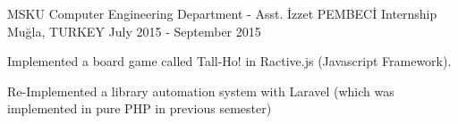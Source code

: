 \begin{cventries}
    \cventry
        {MSKU Computer Engineering Department - Asst. İzzet PEMBECİ}
        {Internship}
        {Muğla, TURKEY}
        {July 2015 - September 2015}
        {
          \begin{cvitems}
            \item {Implemented a board game called Tall-Ho! in Ractive.js (Javascript Framework).}
            \item {Re-Implemented a library automation system with Laravel (which was implemented in pure PHP in previous semester)}
          \end{cvitems}
        }

\end{cventries}
